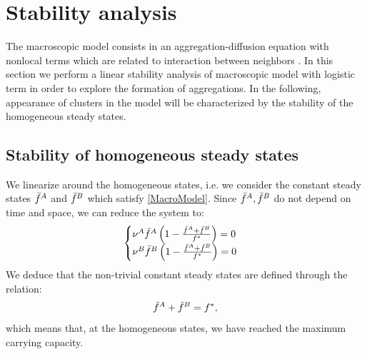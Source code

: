 \section{Stability analysis}

The macroscopic model consists in an aggregation-diffusion equation with nonlocal terms which are related to interaction between neighbors .
In this section we perform a linear stability analysis of macroscopic model with logistic term in order to explore the formation of aggregations. In the following, appearance of clusters in the model will be characterized by the stability of the homogeneous steady states.

\subsection{Stability of homogeneous steady states}

We linearize around the homogeneous states, i.e. we consider the constant steady states ${\bar{f}^A}$ and ${\bar{f}^B}$ which satisfy \eqref{MacroModel}. 
% 
Since ${\bar{f}^A},{\bar{f}^B}$ do not depend on time and space, we can reduce the system to:%
\begin{equation}
\begin{cases}
	{\nu^A}{\bar{f}^A}\left( 1-\frac{{\bar{f}^A}+{\bar{f}^B}}{{f^{*}}} \right)=0 \\
	{\nu^B}{\bar{f}^B}\left( 1-\frac{{\bar{f}^A}+{\bar{f}^B}}{{f^{*}}} \right)=0
\end{cases}
\end{equation}
We deduce that the non-trivial constant steady states are defined through the relation:
\begin{equation}
 {\bar{f}^A}+{\bar{f}^B}={f^{*}},
\end{equation}
which means that, at the homogeneous states, we have reached the maximum carrying capacity. 

